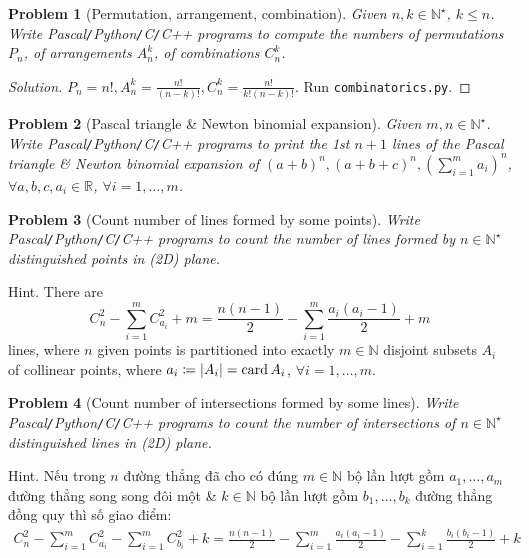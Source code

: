 \documentclass{article}
\newtheorem{problem}{Problem}
\begin{document}
\begin{problem}[Permutation, arrangement, combination]
	Given $n,k\in\mathbb{N}^\star$, $k\le n$. Write {\sf Pascal{\tt/}Python{\tt/}C{\tt/}C++} programs to compute the numbers of permutations $P_n$, of arrangements $A_n^k$, of combinations $C_n^k$.
\end{problem}

\begin{proof}[Solution]
	$P_n = n!,A_n^k = \frac{n!}{(n - k)!},C_n^k = \frac{n!}{k!(n - k)!}$. Run {\tt combinatorics.py}.		
\end{proof}

\begin{problem}[Pascal triangle \& Newton binomial expansion]
	Given $m,n\in\mathbb{N}^\star$. Write {\sf Pascal{\tt/}Python{\tt/}C{\tt/}C++} programs to print the 1st $n + 1$ lines of the Pascal triangle \& Newton binomial expansion of $(a + b)^n,(a + b + c)^n,\left(\sum_{i=1}^m a_i\right)^n$,  $\forall a,b,c,a_i\in\mathbb{R}$, $\forall i = 1,\ldots,m$.
\end{problem}

\begin{problem}[Count number of lines formed by some points]
	Write {\sf Pascal{\tt/}Python{\tt/}C{\tt/}C++} programs to count the number of lines formed by $n\in\mathbb{N}^\star$ distinguished points in (2D) plane.
\end{problem}
{\sf Hint.} There are
\begin{equation}
	C_n^2 - \sum_{i=1}^m C_{a_i}^2 + m = \frac{n(n - 1)}{2} - \sum_{i=1}^m \frac{a_i(a_i - 1)}{2} + m
\end{equation}
lines, where $n$ given points is partitioned into exactly $m\in\mathbb{N}$ disjoint subsets $A_i$ of collinear points, where $a_i\coloneqq|A_i| = {\rm card}\,A_i$, $\forall i = 1,\ldots,m$.

\begin{problem}[Count number of intersections formed by some lines]
	Write {\sf Pascal{\tt/}Python{\tt/}C{\tt/}C++} programs to count the number of intersections of $n\in\mathbb{N}^\star$ distinguished lines in (2D) plane.
\end{problem}
{\sf Hint.} Nếu trong $n$ đường thẳng đã cho có đúng $m\in\mathbb{N}$ bộ lần lượt gồm $a_1,\ldots,a_m$ đường thẳng song song đôi một \& $k\in\mathbb{N}$ bộ lần lượt gồm $b_1,\ldots,b_k$ đường thẳng đồng quy thì số giao điểm:
\begin{align}
	C_n^2 - \sum_{i=1}^m C_{a_i}^2 - \sum_{i=1}^m C_{b_i}^2 + k = \frac{n(n - 1)}{2} - \sum_{i=1}^m \frac{a_i(a_i - 1)}{2} - \sum_{i=1}^k \frac{b_i(b_i - 1)}{2} + k
\end{align}
\end{document}
